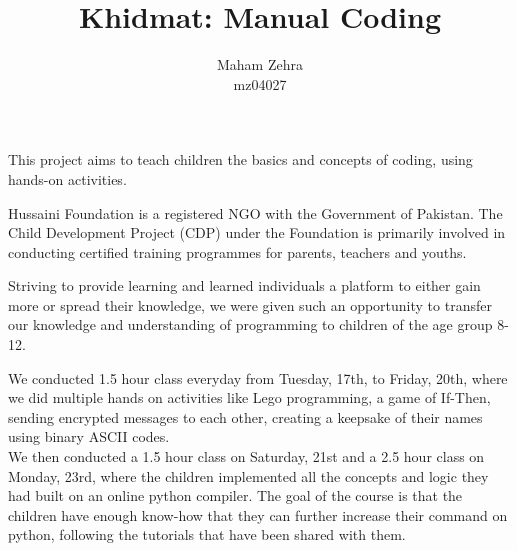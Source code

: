 \documentclass{article}
\title {Khidmat: Manual Coding}
\author{
  Maham Zehra\\ mz04027
}
\date{}
\begin{document}
\maketitle


\noindent
This project aims to teach children the basics and concepts of coding, using hands-on activities.
\vspace{2.5mm}

\noindent
 Hussaini Foundation is a registered NGO with the Government of Pakistan. The Child Development Project (CDP) under the Foundation is primarily involved in conducting certified training programmes for parents, teachers and youths.\cite{cdp-hf} 
 \vspace{2.5mm}

\noindent
Striving to provide learning and learned individuals a platform to either gain more or spread their knowledge, we were given such an opportunity to transfer our knowledge and understanding of programming to children of the age group 8-12. 
\vspace{2.5mm}

\noindent 
We conducted 1.5 hour class everyday from Tuesday, 17th, to Friday, 20th, where we did multiple hands on activities like Lego programming, a game of If-Then, sending encrypted messages to each other, creating a keepsake of their names using binary ASCII codes. \\ We then conducted a 1.5 hour class on Saturday, 21st and a 2.5 hour class on Monday, 23rd, where the children implemented all the concepts and logic they had built on an online python compiler.
The goal of the course is that the children have enough know-how that they can further increase their command on python, following the tutorials that have been shared with them.
\end{document}
